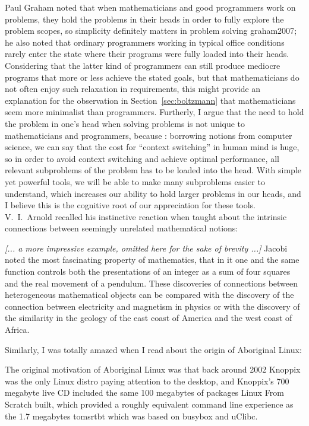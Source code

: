 Paul Graham noted that when mathematicians and good programmers work on
problems, they hold the problems in their heads in order to fully explore the
problem scopes, so simplicity definitely matters in problem solving\cupercite%
{graham2007}; he also noted that ordinary programmers working in typical
office conditions rarely enter the state where their programs were fully loaded
into their heads.  Considering that the latter kind of programmers can still
produce mediocre programs that more or less achieve the stated goals, but that
mathematicians do not often enjoy such relaxation in requirements, this might
provide an explanation for the observation in Section~\ref{sec:boltzmann}
that mathematicians seem more minimalist than programmers.  Furtherly, I argue
that the need to hold the problem in one's head when solving problems is not
unique to mathematicians and programmers, because : borrowing notions from computer science, we can say that the
cost for ``context switching'' in human mind is huge, so in order to avoid
context switching and achieve optimal performance, all relevant subproblems
of the problem has to be loaded into the head.  With simple yet powerful tools,
we will be able to make many subproblems easier to understand, which increases
our ability to hold larger problems in our heads, and I believe this is the
cognitive root of our appreciation for these tools.  V.~I.\ Arnold recalled
his instinctive reaction when taught about the intrinsic connections between
seemingly unrelated mathematical notions:
\begin{quoting}
	\emph{[... a more impressive example, omitted here for the sake of
	brevity ...]} Jacobi noted the most fascinating property of mathematics,
	that in it one and the same function controls both the presentations of
	an integer as a sum of four squares and the real movement of a pendulum.
	These discoveries of connections between heterogeneous mathematical objects
	can be compared with the discovery of the connection between electricity
	and magnetism in physics or with the discovery of the similarity in
	the geology of the east coast of America and the west coast of Africa.
\end{quoting}
Similarly, I was totally amazed when I read about the
origin of Aboriginal Linux:
\begin{quoting}
	The original motivation of Aboriginal Linux was that back around
	2002 Knoppix was the only Linux distro paying attention to the
	desktop, and Knoppix's 700 megabyte live CD included the same
	100 megabytes of packages Linux From Scratch built, which
	provided a roughly equivalent command line experience as the
	1.7 megabytes tomsrtbt which was based on busybox and uClibc.
\end{quoting}

